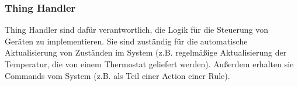 \subsubsection{Thing Handler}
Thing Handler sind dafür verantwortlich, die Logik für die Steuerung von Geräten zu implementieren. Sie sind zuständig für die automatische Aktualisierung von Zuständen im System (z.B. regelmäßige Aktualisierung der Temperatur, die von einem Thermostat geliefert werden). Außerdem erhalten sie Commands vom System (z.B. als Teil einer Action einer Rule).








